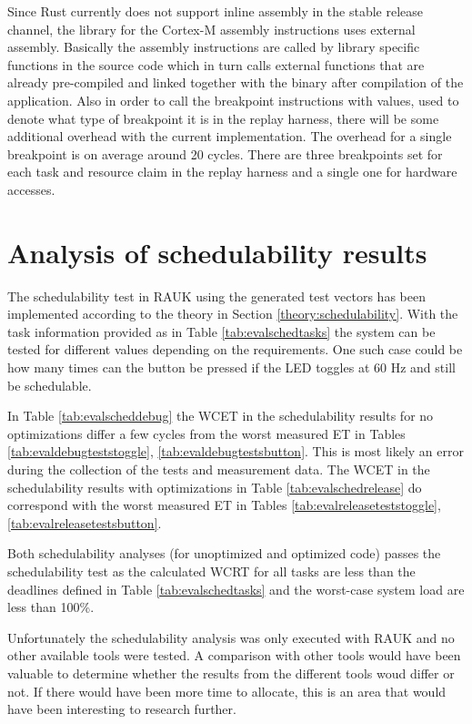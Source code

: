 Since Rust currently does not support inline assembly in the stable release
channel, the library for the Cortex-M assembly instructions uses external
assembly. Basically the assembly instructions are called by library specific
functions in the source code which in turn calls external functions that are
already pre-compiled and linked together with the binary after compilation of
the application. Also in order to call the breakpoint instructions with values,
used to denote what type of breakpoint it is in the replay harness, there will
be some additional overhead with the current implementation. The overhead for a
single breakpoint is on average around 20 cycles. There are three breakpoints
set for each task and resource claim in the replay harness and a single one for
hardware accesses.

\section{Analysis of schedulability results}
The schedulability test in RAUK using the generated test vectors has been
implemented according to the theory in Section \ref{theory:schedulability}.
With the task information provided as in Table \ref{tab:evalschedtasks} the
system can be tested for different values depending on the requirements. One
such case could be how many times can the button be pressed if the LED toggles
at 60 Hz and still be schedulable.

In Table \ref{tab:evalscheddebug} the WCET in the schedulability results for no
optimizations differ a few cycles from the worst measured ET in Tables
\ref{tab:evaldebugteststoggle}, \ref{tab:evaldebugtestsbutton}. This is most
likely an error during the collection of the tests and measurement data. The
WCET in the schedulability results with optimizations in Table
\ref{tab:evalschedrelease} do correspond with the worst measured ET in Tables
\ref{tab:evalreleaseteststoggle}, \ref{tab:evalreleasetestsbutton}.

Both schedulability analyses (for unoptimized and optimized code) passes the
schedulability test as the calculated WCRT for all tasks are less than
the deadlines defined in Table \ref{tab:evalschedtasks} and the worst-case
system load are less than 100\%.

Unfortunately the schedulability analysis was only executed with RAUK and no
other available tools were tested. A comparison with other tools would have
been valuable to determine whether the results from the different tools woud
differ or not. If there would have been more time to allocate, this is an
area that would have been interesting to research further.

